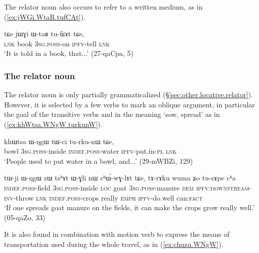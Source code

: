 The relator noun  also occurs to refer to a written medium, as in (\ref{ex:jWGi.WtaR.tufCAt}).

\begin{exe}
\ex \label{ex:jWGi.WtaR.tufCAt}
\gll  tɕe jɯɣi ɯ-taʁ tu-fɕɤt tɕe, \\
\textsc{lnk} book \textsc{3sg}.\textsc{poss}-on \textsc{ipfv}-tell \textsc{lnk} \\
\glt `It is told in a book, that...' (27-qaCpa, 5)
\end{exe} 

\subsubsection{The relator noun } \label{sec:WNgW}
The relator noun  is only partially grammaticalized (§\ref{sec:other.locative.relator}). However, it is selected by a few verbs to mark an oblique argument, in particular the goal of the transitive verbs  and  in the meaning `sow, spread' as in (\ref{ex:khWtsa.WNgW.turkunW}).

\begin{exe}
\ex \label{ex:khWtsa.WNgW.turkunW}
\gll khɯtsa ɯ-ŋgɯ tɯ-ci tu-rku-nɯ tɕe, \\
bowl \textsc{3sg}.\textsc{poss}-inside  \textsc{indef}.\textsc{poss}-water \textsc{ipfv}-put.in-\textsc{pl} \textsc{lnk} \\
\glt `People used to put water in a bowl, and...' (29-mWBZi, 129)
\end{exe} 

\begin{exe}
\ex \label{ex:tWji.WNgW.chWwGlAt}
\gll tɯ-ji ɯ-ŋgɯ zɯ tsʰɤt ɯ-ɣli nɯ cʰɯ́-wɣ-lɤt tɕe, tɤ-rɤku wuma ʑo tu-sɤpe cʰa \\
\textsc{indef}.\textsc{poss}-field  \textsc{3sg}.\textsc{poss}-inside \textsc{loc} goat \textsc{3sg}.\textsc{poss}-manure \textsc{dem} \textsc{ipfv}:\textsc{downstream}-\textsc{inv}-throw \textsc{lnk} \textsc{indef}.\textsc{poss}-crops really \textsc{emph} \textsc{ipfv}-do.well can:\textsc{fact} \\
\glt `If one spreads goat manure on the fields, it can make the crops grow really well.' (05-qaZo, 33)
\end{exe} 

It is also found in combination with motion verb to express the means of transportation used during the whole travel, as in (\ref{ex:chuzu.WNgW}).

